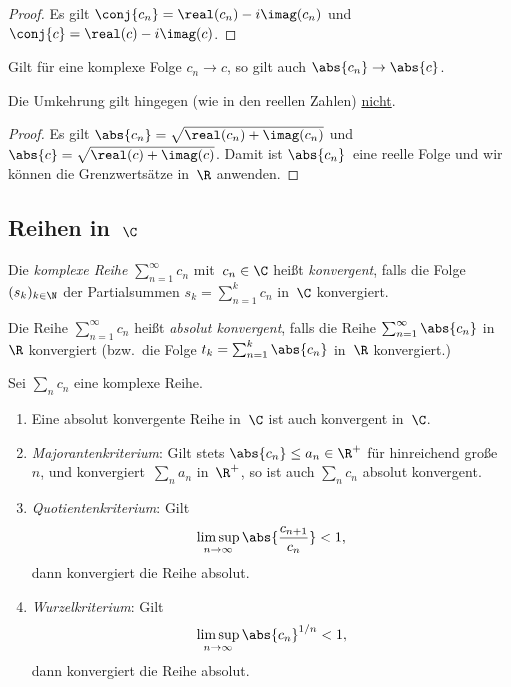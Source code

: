 \documentclass[a4paper]{article}
\begin{document}
\begin{proof}
    Es gilt $\conj{c_n} = \real(c_n)-i\imag(c_n)$ und $\conj{c} = \real(c)-i\imag(c)$.
\end{proof}

\begin{corollary}
    Gilt für eine komplexe Folge $c_n \to c$, so gilt auch $\abs{c_n} \to \abs{c}$.
\end{corollary}

Die Umkehrung gilt hingegen (wie in den reellen Zahlen) \underline{nicht}.

\begin{proof}
    Es gilt $\abs{c_n} = \sqrt{\real(c_n)+\imag(c_n)}$ und $\abs{c} = \sqrt{\real(c)+\imag(c)}$. Damit ist $\abs{c_n}$~eine reelle Folge und wir können die Grenzwertsätze in~$\R$ anwenden.
\end{proof}

\subsection{Reihen in~\texorpdfstring{$\C$}{C}}

\begin{definition}
    Die \emph{komplexe Reihe} $\sum_{n=1}^\infty c_n$ mit~$c_n \in \C$ heißt \emph{konvergent}, falls die Folge $(s_k)_{k\in\N}$ der Partialsummen $s_k = \sum_{n=1}^k c_n$ in~$\C$ konvergiert.

    Die Reihe $\sum_{n=1}^\infty c_n$ heißt \emph{absolut konvergent}, falls die Reihe $\sum_{n=1}^\infty \abs{c_n}$ in~$\R$ konvergiert (bzw.\ die Folge $t_k = \sum_{n=1}^k \abs{c_n}$ in~$\R$ konvergiert.)
\end{definition}

\begin{proposition}
    Sei $\sum_n c_n$ eine komplexe Reihe.
    \begin{enumerate}
        \item Eine absolut konvergente Reihe in~$\C$ ist auch konvergent in~$\C$.
        \item \emph{Majorantenkriterium}: Gilt stets $\abs{c_n} \leq a_n \in \R^+$ für hinreichend große~$n$, und konvergiert~$\sum_n a_n$ in~$\R^+$, so ist auch $\sum_n c_n$ absolut konvergent.
        \item \emph{Quotientenkriterium}: Gilt
        \begin{equation*}
            \limsup_{n\to\infty} \abs{\frac{c_{n+1}}{c_n}} < 1,
        \end{equation*}
        dann konvergiert die Reihe absolut.
        \item \emph{Wurzelkriterium}: Gilt
        \begin{equation*}
            \limsup_{n\to\infty} \abs{c_n}^{1/n} < 1,
        \end{equation*}
        dann konvergiert die Reihe absolut.
    \end{enumerate}
\end{proposition}
\end{document}
